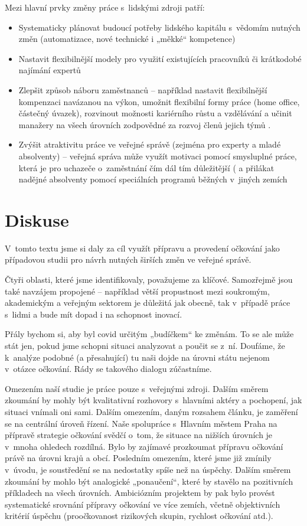 Mezi hlavní prvky změny práce s~lidskými zdroji patří:

\begin{itemize}
  \item Systematicky plánovat budoucí potřeby lidského kapitálu s~vědomím nutných změn (automatizace, nové technické i „měkké“ kompetence)
  \item Nastavit flexibilnější modely pro využití existujících pracovníků či krátkodobé najímání expertů
  \item Zlepšit způsob náboru zaměstnanců -- například nastavit flexibilnější kompenzaci navázanou na výkon, umožnit flexibilní formy práce (home office, částečný úvazek), rozvinout možnosti kariérního růstu a vzdělávání a učinit manažery na všech úrovních zodpovědné za rozvoj členů jejich týmů \cite{thomas_finding_2021, mckinsey_desetileti_2021}.
  \item  Zvýšit atraktivitu práce ve veřejné správě (zejména pro experty a mladé absolventy) -- veřejná správa může využít motivaci pomocí smysluplné práce, která je pro uchazeče o~zaměstnání čím dál tím důležitější (\cite{achor_9_2018} a přilákat nadějné absolventy pomocí speciálních programů běžných v~jiných zemích \cite{noauthor_home_2020, mckinsey_desetileti_2021}
\end{itemize}

\section*{Diskuse}

V~tomto textu jsme si daly za cíl využít přípravu a provedení očkování jako případovou studii pro návrh nutných širších změn ve veřejné správě.

Čtyři oblasti, které jsme identifikovaly, považujeme za klíčové. Samozřejmě jsou také navzájem propojené -- například větší propustnost mezi soukromým, akademickým a veřejným sektorem je důležitá jak obecně, tak v~případě práce s~lidmi a bude mít dopad i na schopnost inovací.

Přály bychom si, aby byl covid určitým „budíčkem“ ke změnám. To se ale může stát jen, pokud jsme schopni situaci analyzovat a poučit se z~ní. Doufáme, že k~analýze podobné (a přesahující) tu naši dojde na úrovni státu nejenom v~otázce očkování. Rády se takového dialogu zúčastníme.

Omezením naší studie je práce pouze s~veřejnými zdroji. Dalším směrem zkoumání by mohly být kvalitativní rozhovory s~hlavními aktéry a pochopení, jak situaci vnímali oni sami. Dalším omezením, daným rozsahem článku, je zaměření se na centrální úroveň řízení. Naše spolupráce s~Hlavním městem Praha na přípravě strategie očkování \cite{hygienicka_stanice_praha_2021} svědčí o~tom, že situace na nižších úrovních je v~mnoha ohledech rozdílná. Bylo by zajímavé prozkoumat přípravu očkování právě na úrovni krajů a obcí. Posledním omezením, které jsme již zmínily v~úvodu, je soustředění se na nedostatky spíše než na úspěchy. Dalším směrem zkoumání by mohlo být analogické „ponaučení“, které by stavělo na pozitivních příkladech na všech úrovních. Ambiciózním projektem by pak bylo provést systematické srovnání přípravy očkování ve více zemích, včetně objektivních kritérií úspěchu (proočkovanost rizikových skupin, rychlost očkování atd.).

